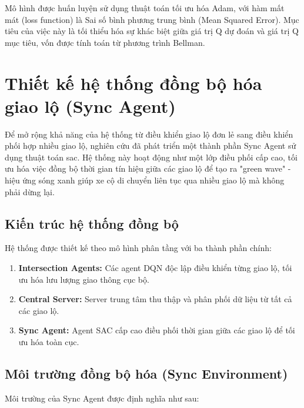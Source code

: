 Mô hình được huấn luyện sử dụng thuật toán tối ưu hóa Adam, với hàm mất mát (loss function) là Sai số bình phương trung bình (Mean Squared Error). Mục tiêu của việc này là tối thiểu hóa sự khác biệt giữa giá trị Q dự đoán và giá trị Q mục tiêu, vốn được tính toán từ phương trình Bellman.

\section{Thiết kế hệ thống đồng bộ hóa giao lộ (Sync Agent)}

Để mở rộng khả năng của hệ thống từ điều khiển giao lộ đơn lẻ sang điều khiển phối hợp nhiều giao lộ, nghiên cứu đã phát triển một thành phần Sync Agent sử dụng thuật toán \ac{sac}. Hệ thống này hoạt động như một lớp điều phối cấp cao, tối ưu hóa việc đồng bộ thời gian tín hiệu giữa các giao lộ để tạo ra "green wave" - hiệu ứng sóng xanh giúp xe cộ di chuyển liên tục qua nhiều giao lộ mà không phải dừng lại.

\subsection{Kiến trúc hệ thống đồng bộ}
Hệ thống được thiết kế theo mô hình phân tầng với ba thành phần chính:

\begin{enumerate}
    \item \textbf{Intersection Agents:} Các agent DQN độc lập điều khiển từng giao lộ, tối ưu hóa lưu lượng giao thông cục bộ.

    \item \textbf{Central Server:} Server trung tâm thu thập và phân phối dữ liệu từ tất cả các giao lộ.

    \item \textbf{Sync Agent:} Agent SAC cấp cao điều phối thời gian giữa các giao lộ để tối ưu hóa toàn cục.
\end{enumerate}

\subsection{Môi trường đồng bộ hóa (Sync Environment)}
Môi trường của Sync Agent được định nghĩa như sau:


